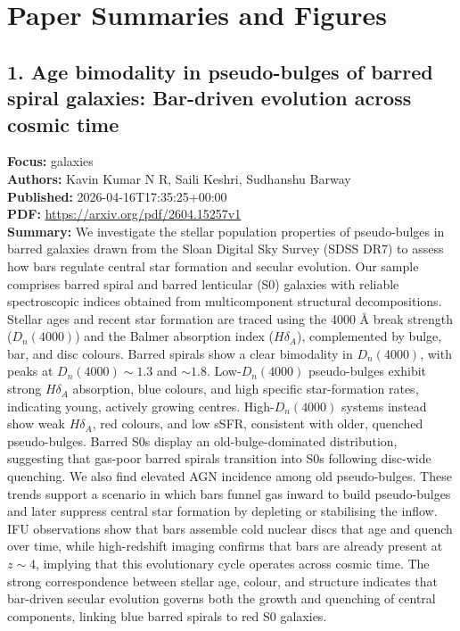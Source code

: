 \documentclass[11pt]{article}
\begin{document}
\section*{Paper Summaries and Figures}
\subsection*{1. Age bimodality in pseudo-bulges of barred spiral galaxies: Bar-driven evolution across cosmic time}
\textbf{Focus:} galaxies\\
\textbf{Authors:} Kavin Kumar N R, Saili Keshri, Sudhanshu Barway\\
\textbf{Published:} 2026-04-16T17:35:25+00:00\\
\textbf{PDF:} \href{https://arxiv.org/pdf/2604.15257v1}{https://arxiv.org/pdf/2604.15257v1}\\
\textbf{Summary:}
We investigate the stellar population properties of pseudo-bulges in barred galaxies drawn from the Sloan Digital Sky Survey (SDSS DR7) to assess how bars regulate central star formation and secular evolution. Our sample comprises barred spiral and barred lenticular (S0) galaxies with reliable spectroscopic indices obtained from multicomponent structural decompositions. Stellar ages and recent star formation are traced using the 4000 Å break strength ($D_{n}(4000)$) and the Balmer absorption index ($H\delta _{A}$), complemented by bulge, bar, and disc colours. Barred spirals show a clear bimodality in $D_{n}(4000)$, with peaks at $D_{n}(4000)\sim1.3$ and $\sim1.8$. Low-$D_{n}(4000)$ pseudo-bulges exhibit strong $H\delta _{A}$ absorption, blue colours, and high specific star-formation rates, indicating young, actively growing centres. High-$D_{n}(4000)$ systems instead show weak $H\delta _{A}$, red colours, and low sSFR, consistent with older, quenched pseudo-bulges. Barred S0s display an old-bulge-dominated distribution, suggesting that gas-poor barred spirals transition into S0s following disc-wide quenching. We also find elevated AGN incidence among old pseudo-bulges. These trends support a scenario in which bars funnel gas inward to build pseudo-bulges and later suppress central star formation by depleting or stabilising the inflow. IFU observations show that bars assemble cold nuclear discs that age and quench over time, while high-redshift imaging confirms that bars are already present at $z\sim4$, implying that this evolutionary cycle operates across cosmic time. The strong correspondence between stellar age, colour, and structure indicates that bar-driven secular evolution governs both the growth and quenching of central components, linking blue barred spirals to red S0 galaxies.
\newpage
\end{document}
